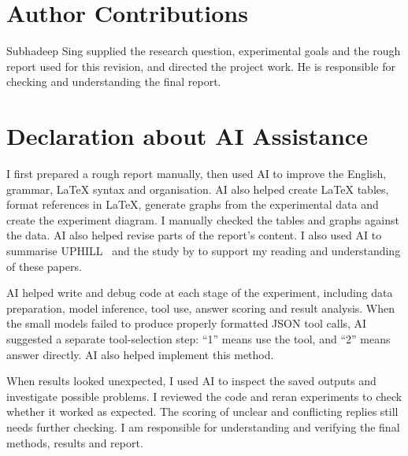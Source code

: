 \documentclass{article}
\begin{document}
\label{lastmainpage}

\clearpage
\section*{Author Contributions}
Subhadeep Sing supplied the research question, experimental goals and the rough report used for this revision, and directed the project work. He is responsible for checking and understanding the final report.

\section*{Declaration about AI Assistance}
I first prepared a rough report manually, then used AI to improve the English, grammar, LaTeX syntax and organisation. AI also helped create LaTeX tables, format references in LaTeX, generate graphs from the experimental data and create the experiment diagram. I manually checked the tables and graphs against the data. AI also helped revise parts of the report's content. I also used AI to summarise UPHILL~\citep{kaur2024} and the study by \citet{sathyanathan2026} to support my reading and understanding of these papers.

AI helped write and debug code at each stage of the experiment, including data preparation, model inference, tool use, answer scoring and result analysis. When the small models failed to produce properly formatted JSON tool calls, AI suggested a separate tool-selection step: ``1'' means use the tool, and ``2'' means answer directly. AI also helped implement this method.

When results looked unexpected, I used AI to inspect the saved outputs and investigate possible problems. I reviewed the code and reran experiments to check whether it worked as expected. The scoring of unclear and conflicting replies still needs further checking. I am responsible for understanding and verifying the final methods, results and report.



\end{document}

